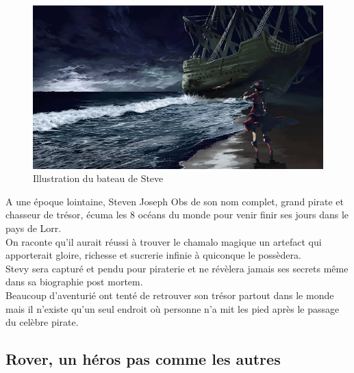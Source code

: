 \documentclass[a4paper 12pts]{article}
\begin{document}
\begin{figure}[h]
  	\includegraphics[width=350pt]{Illustration/Steve.jpg}
	\caption{Illustration du bateau de Steve}
\end{figure}

\vspace{1cm}

A une époque lointaine, Steven Joseph Obs de son nom complet, grand pirate et chasseur de trésor, écuma les 8 océans du monde pour venir finir ses jours dans le pays de Lorr.\\
On raconte qu'il aurait réussi à trouver le chamalo magique un artefact qui apporterait gloire, richesse et sucrerie infinie à quiconque le possèdera.\\
Stevy sera capturé et pendu pour piraterie et ne révèlera jamais ses secrets même dans sa biographie post mortem.\\
Beaucoup d'aventurié ont tenté de retrouver son trésor partout dans le monde mais il n'existe qu'un seul endroit où personne n'a mit les pied après le passage du celèbre pirate.



\newpage

\subsection{Rover, un héros pas comme les autres}

\vspace{1cm}
\end{document}
